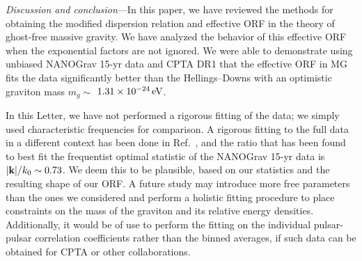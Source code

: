 \documentclass[prd,twocolumn,aps,psfig,nofootinbib,nobibnotes,superscriptaddress,preprintnumbers,times]{revtex4-2}
\newcommand{\eV}{\,{\rm eV}}
\begin{document}
\textit{Discussion and conclusion}---In this paper, we have reviewed the methods for obtaining the modified dispersion relation and effective ORF in the theory of ghost-free massive gravity. We have analyzed the behavior of this effective ORF when the exponential factors are not ignored. We were able to demonstrate using unbiased NANOGrav 15-yr data and CPTA DR1 that the effective ORF in MG fits the data significantly better than the Hellings–Downs with an optimistic graviton mass $m_g \sim$ $1.31\times10^{-24} \eV$.

In this Letter, we have not performed a rigorous fitting of the data; we simply used characteristic frequencies for comparison. A rigorous fitting to the full data in a different context has been done in Ref.\ \cite{Arjona:2024cex}, and the ratio that has been found to best fit the frequentist optimal statistic of the NANOGrav 15-yr data is $|{\bf k}|/k_0 \sim 0.73$. We deem this to be plausible, based on our statistics and the resulting shape of our ORF. A future study may introduce more free parameters than the ones we considered and perform a holistic fitting procedure to place constraints on the mass of the graviton and its relative energy densities. Additionally, it would be of use to perform the fitting on the individual pulsar-pulsar correlation coefficients rather than the binned averages, if such data can be obtained for CPTA or other collaborations. 
\end{document}
